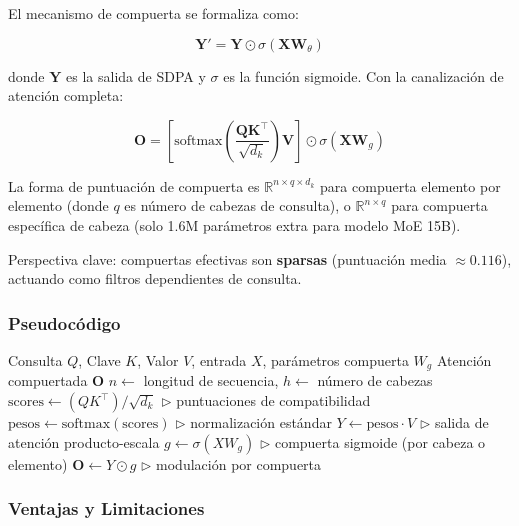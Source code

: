 \documentclass[11pt,a4paper]{article}
\begin{document}
El mecanismo de compuerta se formaliza como:

\begin{equation}
\mathbf{Y}' = \mathbf{Y} \odot \sigma(\mathbf{X}\mathbf{W}_\theta)
\end{equation}

donde $\mathbf{Y}$ es la salida de SDPA y $\sigma$ es la función sigmoide. Con la canalización de atención completa:

\begin{equation}
\mathbf{O} = \left[\text{softmax}\left(\frac{\mathbf{Q}\mathbf{K}^\top}{\sqrt{d_k}}\right) \mathbf{V}\right] \odot \sigma(\mathbf{X}\mathbf{W}_g)
\end{equation}

La forma de puntuación de compuerta es $\mathbb{R}^{n \times q \times d_k}$ para compuerta elemento por elemento (donde $q$ es número de cabezas de consulta), o $\mathbb{R}^{n \times q}$ para compuerta específica de cabeza (solo 1.6M parámetros extra para modelo MoE 15B).

Perspectiva clave: compuertas efectivas son \textbf{sparsas} (puntuación media $\approx 0.116$), actuando como filtros dependientes de consulta.

\subsubsection{Pseudocódigo}

\begin{algorithm}
\caption{Atención con Compuerta - Compuerta Sigmoide post-SDPA}
\begin{algorithmic}[1]
\Require Consulta $Q$, Clave $K$, Valor $V$, entrada $X$, parámetros compuerta $W_g$
\Ensure Atención compuertada $\mathbf{O}$
\State $n \gets$ longitud de secuencia, $h \gets$ número de cabezas
\State $\text{scores} \gets (QK^\top) / \sqrt{d_k}$ \quad $\triangleright$ puntuaciones de compatibilidad
\State $\text{pesos} \gets \text{softmax}(\text{scores})$ \quad $\triangleright$ normalización estándar
\State $Y \gets \text{pesos} \cdot V$ \quad $\triangleright$ salida de atención producto-escala
\State $g \gets \sigma(X W_g)$ \quad $\triangleright$ compuerta sigmoide (por cabeza o elemento)
\State $\mathbf{O} \gets Y \odot g$ \quad $\triangleright$ modulación por compuerta
\end{algorithmic}
\end{algorithm}

\subsubsection{Ventajas y Limitaciones}
\end{document}

